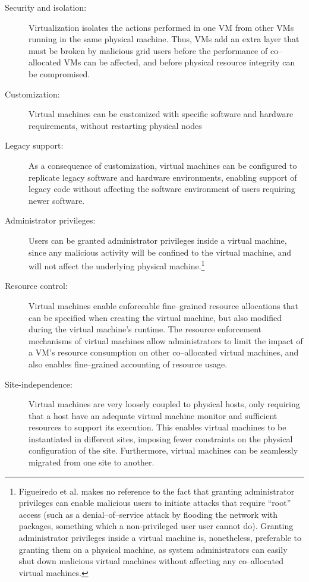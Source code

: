\begin{description}
\item[Security and isolation:] Virtualization isolates the actions performed in one VM from other VMs running in the same physical machine. Thus, VMs add an extra layer that must be broken by malicious grid users before the performance of co--allocated VMs can be affected, and before physical resource integrity can be compromised.
\item[Customization:] Virtual machines can be customized with specific software and hardware requirements, without restarting physical nodes
\item[Legacy support:] As a consequence of customization, virtual machines can be configured to replicate legacy software and hardware environments, enabling support of legacy code without affecting the software environment of users requiring newer software.
\item[Administrator privileges:] Users can be granted administrator privileges inside a virtual machine, since any malicious activity will be confined to the virtual machine, and will not affect the underlying physical machine.\footnote{Figueiredo et al. makes no reference to the fact that granting administrator privileges can enable malicious users to initiate attacks that require ``root'' access (such as a denial--of--service attack by flooding the network with packages, something which a non-privileged user user cannot do). Granting administrator privileges inside a virtual machine is, nonetheless, preferable to granting them on a physical machine, as system administrators can easily shut down malicious virtual machines without affecting any co--allocated virtual machines.}
\item[Resource control:] Virtual machines enable enforceable fine--grained resource allocations that can be specified when creating the virtual machine, but also modified during the virtual machine's runtime. The resource enforcement mechanisms of virtual machines allow administrators to limit the impact of a VM's resource consumption on other co--allocated virtual machines, and also enables fine--grained accounting of resource usage. 
\item[Site-independence:] Virtual machines are very loosely coupled to physical hosts, only requiring that a host have an adequate virtual machine monitor and sufficient resources to support its execution. This enables virtual machines to be instantiated in different sites, imposing fewer constraints on the physical configuration of the site. Furthermore, virtual machines can be seamlessly migrated from one site to another.
\end{description}

